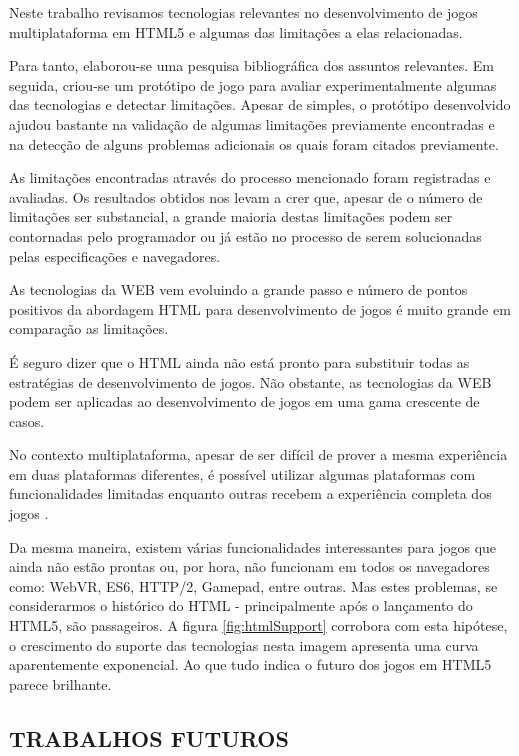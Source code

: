 
Neste trabalho revisamos tecnologias relevantes no desenvolvimento
de jogos multiplataforma em HTML5 e algumas das limitações a elas
relacionadas.

Para tanto, elaborou-se uma pesquisa bibliográfica
dos assuntos relevantes. Em seguida, criou-se um protótipo de jogo
para avaliar experimentalmente algumas das tecnologias e detectar
limitações. Apesar de simples, o protótipo desenvolvido ajudou
bastante na validação de algumas limitações previamente encontradas
e na detecção de alguns problemas adicionais os quais foram citados
previamente.

As limitações encontradas através do processo mencionado foram
registradas e avaliadas. Os resultados obtidos nos levam a crer que,
apesar de o número de limitações ser substancial, a grande maioria
destas limitações podem ser contornadas pelo programador ou já estão
no processo de serem solucionadas pelas especificações e navegadores.

As tecnologias da WEB vem evoluindo a grande passo e número de pontos
positivos da abordagem HTML para desenvolvimento de jogos é muito
grande em comparação as limitações.

É seguro dizer que o HTML ainda não está pronto para substituir todas
as estratégias de desenvolvimento de jogos. Não obstante, as tecnologias
da WEB podem ser aplicadas ao desenvolvimento de jogos em uma gama
crescente de casos.

No contexto multiplataforma, apesar de ser difícil de prover a
mesma experiência em duas plataformas diferentes, é possível
utilizar algumas plataformas com funcionalidades limitadas enquanto
outras recebem a experiência completa dos jogos \autocite[p.
1]{currentStateCrossPlatform}.

Da mesma maneira, existem várias funcionalidades interessantes para
jogos que ainda não estão prontas ou, por hora, não funcionam
em todos os navegadores como: WebVR, ES6, HTTP/2, Gamepad, entre
outras. Mas estes problemas, se considerarmos o histórico do HTML -
principalmente após o lançamento do HTML5, são passageiros. A figura
\ref{fig:htmlSupport} corrobora com esta hipótese, o crescimento do
suporte das tecnologias nesta imagem apresenta uma curva aparentemente
exponencial. Ao que tudo indica o futuro dos jogos em HTML5 parece
brilhante.

\subsection{TRABALHOS FUTUROS}


